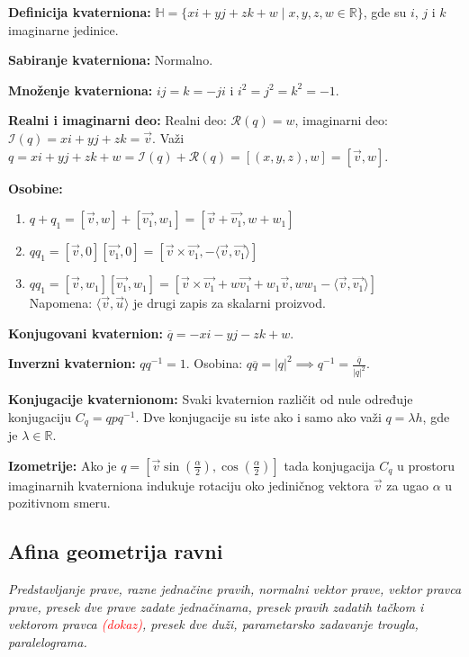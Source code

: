 \documentclass[12pt]{article}
\newcommand{\vek}[1]{\overrightarrow{#1}}
\newcommand{\ocena}[1]{\textcolor{red}{#1}}
\begin{document}
\textbf{Definicija kvaterniona:}
$\mathbb{H}=\{xi+yj+zk+w\mid x,y,z,w\in\mathbb{R}\}$, gde su $i$, $j$ i $k$
imaginarne jedinice.
\par

\textbf{Sabiranje kvaterniona:} Normalno.
\par

\textbf{Množenje kvaterniona:} $i j=k=-j i$ i $i^2=j^2=k^2=-1$.
\par

\textbf{Realni i imaginarni deo:} Realni deo: $\mathcal{R}(q)=w$, imaginarni
deo: $\mathcal{I}(q)=x i +y j +z k=\vek{v}$. Važi
$q=xi+yj+zk+w=\mathcal{I}(q)+\mathcal{R}(q)=[(x,y,z),w]=[\vek{v},w]$.
\par

\textbf{Osobine:}
\begin{enumerate}[label=\textbf{(\arabic*)}]
    \item $q+q_1=[\vek{v},w]+[\vek{v_1},w_1]=[\vek{v}+\vek{v_1},w+w_1]$
    \item $q q_1=[\vek{v},0][\vek{v_1},0]=[\vek{v}\times\vek{v_1},-\langle\vek{v},\vek{v_1}\rangle]$
    \item $q q_1=[\vek{v},w_1][\vek{v_1},w_1]=[\vek{v}\times\vek{v_1}+w \vek{v_1}+w_1\vek{v},w w_1-\langle\vek{v},\vek{v_1}\rangle]$\\
          Napomena: $\langle\vek{v},\vek{u}\rangle$ je drugi zapis za skalarni proizvod.
\end{enumerate}

\textbf{Konjugovani kvaternion:} $\overline{q}=-x i -y j -z k+w$.
\par

\textbf{Inverzni kvaternion:} $q q^{-1}=1$. Osobina:
$q \overline{q}=|q|^2 \implies q^{-1}=\frac{\overline{q}}{|q|^2}$.
\par

\textbf{Konjugacije kvaternionom:} Svaki kvaternion različit od nule određuje
konjugaciju $C_q=qpq^{-1}$. Dve konjugacije su iste ako i samo ako važi
$q=\lambda h$, gde je $\lambda\in\mathbb{R}$. \par
\textbf{Izometrije:} Ako je $q=[\vek{v}\sin(\frac{\alpha}{2}),\cos(\frac{\alpha}{2})]$
tada konjugacija $C_q$ u prostoru imaginarnih kvaterniona indukuje rotaciju oko jediničnog
vektora $\vek{v}$ za ugao $\alpha$ u pozitivnom smeru.
\par

\subsection{Afina geometrija ravni}
\textit{Predstavljanje prave, razne jednačine pravih, normalni vektor prave,
    vektor pravca prave, presek dve prave zadate jednačinama, presek pravih
    zadatih tačkom i vektorom pravca \ocena{(dokaz)}, presek dve duži, parametarsko
    zadavanje trougla, paralelograma.}
\par
\vspace*{1cm}
\end{document}
